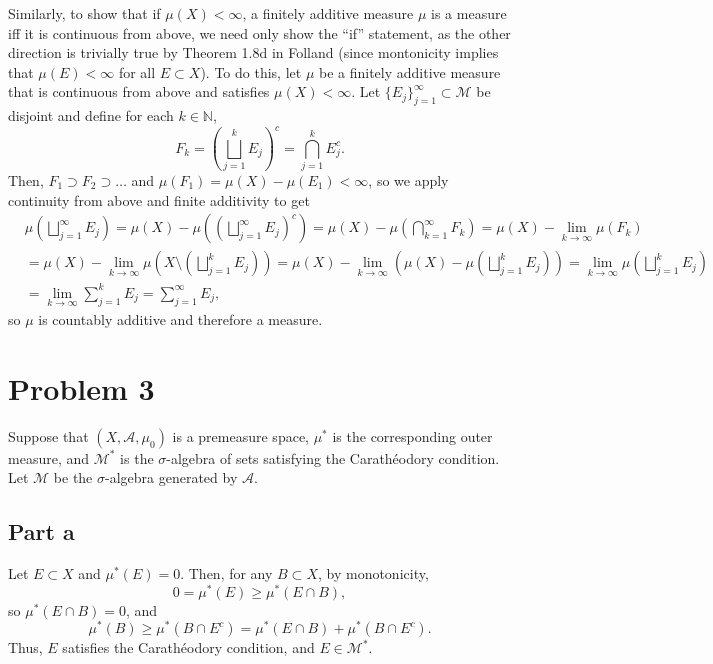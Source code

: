 \documentclass{article}
\begin{document}
Similarly, to show that if $\mu(X)<\infty$, a finitely additive measure $\mu$ is a measure iff it is continuous from above, we need only show the ``if'' statement, as the other direction is trivially true by Theorem 1.8d in Folland (since montonicity implies that $\mu(E)<\infty$ for all $E\subset X$). To do this, let $\mu$ be a finitely additive measure that is continuous from above and satisfies $\mu(X)<\infty$. Let $\{E_j\}_{j=1}^\infty\subset\mathcal M$ be disjoint and define for each $k\in\mathbb{N}$,
\[
F_k=\left(\bigsqcup_{j=1}^k E_j\right)^c=\bigcap_{j=1}^k E_j^c.
\]
Then, $F_1\supset F_2\supset\ldots$ and $\mu(F_1)=\mu(X)-\mu(E_1)<\infty$, so we apply continuity from above and finite additivity to get
\begin{align*}
&\mu\left(\bigsqcup_{j=1}^\infty E_j\right)=\mu(X)-\mu\left(\left(\bigsqcup_{j=1}^\infty E_j\right)^c\right)=\mu(X)-\mu\left(\bigcap_{k=1}^\infty F_k\right)=\mu(X)-\lim_{k\to\infty}\mu(F_k)\\&=
\mu(X)-\lim_{k\to\infty}\mu\left(X\setminus \left(\bigsqcup_{j=1}^k E_j\right)\right)=\mu(X)-\lim_{k\to\infty}\left(\mu(X)-\mu\left(\bigsqcup_{j=1}^k E_j\right)\right)=\lim_{k\to\infty}\mu\left(\bigsqcup_{j=1}^k E_j\right)\\&=
\lim_{k\to\infty}\sum_{j=1}^k E_j=\sum_{j=1}^{\infty}E_j,
\end{align*}
so $\mu$ is countably additive and therefore a measure.

\section{Problem 3}
Suppose that $(X,\mathcal A,\mu_0)$ is a premeasure space, $\mu^*$ is the corresponding outer measure, and $\mathcal M^*$ is the $\sigma$-algebra of sets satisfying the Carath\'eodory condition. Let $\mathcal M$ be the $\sigma$-algebra generated by $\mathcal A$.

\subsection{Part a}
Let $E\subset X$ and $\mu^*(E)=0$. Then, for any $B\subset X$, by monotonicity,
\[
0=\mu^*(E)\geq\mu^*(E\cap B),
\]
so $\mu^*(E\cap B)=0$, and
\[
\mu^*(B)\geq\mu^*(B\cap E^c)=\mu^*(E\cap B)+\mu^*(B\cap E^c).
\]
Thus, $E$ satisfies the Carath\'eodory condition, and $E\in\mathcal M^*$.
\end{document}
